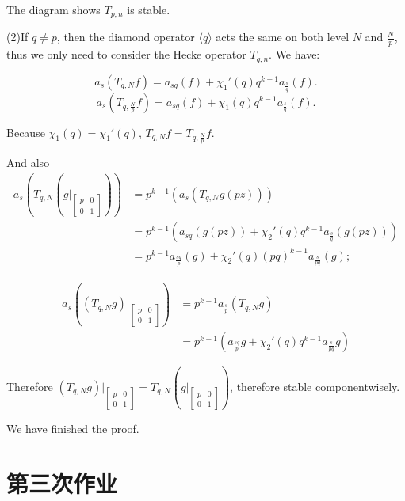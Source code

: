 \begin{enumerate}
The diagram shows $T_{p,n}$ is stable.

(2)If $q \neq p$, then the diamond operator $\langle q \rangle$ acts the same on both level $N$ and $\frac{N}{p}$,
thus we only need to consider the Hecke operator $T_{q,n}$.
We have:

$$a_s(T_{q, N} f) = a_{sq}(f) + \chi_1'(q)q^{k-1} a_{\frac{s}{q}}(f).$$
$$a_s(T_{q, \frac{N}{p}} f) = a_{sq}(f) + \chi_1(q)q^{k-1} a_{\frac{s}{q}}(f).$$

Because $\chi_1(q) = \chi_1'(q)$, $T_{q, N} f = T_{q, \frac{N}{p}}f$.

And also
\begin{align}
a_s(T_{q, N}(g|_{\begin{bmatrix}
    p & 0 \\
    0 & 1
\end{bmatrix}})) &= p^{k-1}(a_{s}(T_{q, N} g(pz))) \\
&= p^{k-1} (a_{sq}(g(pz)) + \chi_2'(q)q^{k-1}a_{\frac{s}{q}}(g(pz))) \\
&= p^{k-1} a_{\frac{sq}{p}}(g) + \chi_2'(q) (pq)^{k-1} a_{\frac{s}{pq}}(g);
\end{align}

\begin{align}
    a_s((T_{q, N}g)|_{\begin{bmatrix}
    p & 0 \\
    0 & 1
\end{bmatrix}}) &= p^{k-1}a_{\frac{s}{p}}(T_{q,N}g) \\
&= p^{k-1} (a_{\frac{sq}{p}}g + \chi_2'(q)q^{k-1}a_{\frac{s}{pq}}g) 
\end{align}

Therefore $(T_{q, N}g)|_{\begin{bmatrix}
    p & 0 \\
    0 & 1
\end{bmatrix}} = T_{q, N}(g|_{\begin{bmatrix}
    p & 0 \\
    0 & 1
\end{bmatrix}})$, therefore stable componentwisely.

We have finished the proof.







\end{enumerate}



\section{第三次作业}

